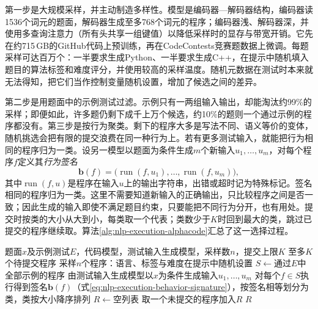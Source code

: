 第一步是大规模采样，并主动制造多样性。模型是编码器—解码器结构，编码器读1536个词元的题面，解码器生成至多768个词元的程序；编码器浅、解码器深，并使用多查询注意力（所有头共享一组键值）以降低采样时的显存与带宽开销。它先在约715\,GB的GitHub代码上预训练，再在CodeContests竞赛题数据上微调。每题采样可达百万个：一半要求生成Python、一半要求生成C++，在提示中随机填入题目的算法标签和难度评分，并使用较高的采样温度。随机元数据在测试时本来就无法得知，把它们当作控制变量随机设置，增加了候选之间的差异。

第二步是用题面中的示例测试过滤。示例只有一两组输入输出，却能淘汰约99\%的采样；即便如此，许多题仍剩下成千上万个候选，约10\%的题则一个通过示例的程序都没有。第三步是按行为聚类。剩下的程序大多是写法不同、语义等价的变体，随机挑选会把有限的提交浪费在同一种行为上。若有更多测试输入，就能把行为相同的程序归为一类。设另一模型以题面为条件生成$m$个新输入$u_1,\ldots,u_m$，对每个程序$f$定义其\emph{行为签名}
\begin{equation}
 \bm b(f)=\bigl(\operatorname{run}(f,u_1),\ldots,\operatorname{run}(f,u_m)\bigr),
 \label{eq:nlp-execution-behavior-signature}
\end{equation}
其中$\operatorname{run}(f,u)$是程序在输入$u$上的输出字符串，出错或超时记为特殊标记。签名相同的程序归为一类。这里不需要知道新输入的正确输出，只比较程序之间是否一致；因此生成的输入即使不满足题目约束，只要能把不同行为分开，也有用处。提交时按类的大小从大到小，每类取一个代表；类数少于$K$时回到最大的类，跳过已提交的程序继续取。算法\ref{alg:nlp-execution-alphacode}汇总了这一选择过程。

\begin{algorithm}
  \label{alg:nlp-execution-alphacode}
  \begin{algorithmic}[1]
    \Require 题面$x$及示例测试$E$，代码模型，测试输入生成模型，采样数$n$，提交上限$K$
    \Ensure 至多$K$个待提交程序
    \State 采样$n$个程序：语言、标签与难度在提示中随机设置
    \State $S\gets$通过$E$中全部示例的程序
    \State 由测试输入生成模型以$x$为条件生成输入$u_1,\ldots,u_m$
    \State 对每个$f\in S$执行得到签名$\bm b(f)$（式\eqref{eq:nlp-execution-behavior-signature}），按签名相等划分为类，类按大小降序排列
    \State $R\gets$空列表
          \State 取一个未提交的程序加入$R$
        \EndIf
      \EndFor
    \EndWhile
    \State \Return $R$
  \end{algorithmic}
\end{algorithm}

